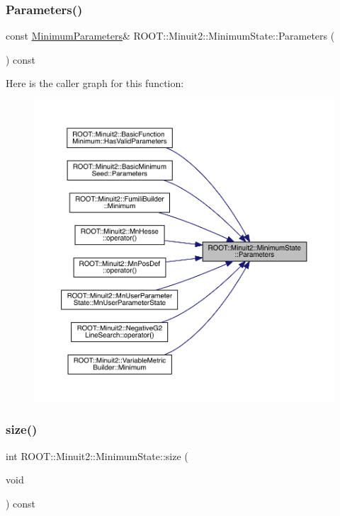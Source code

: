 \subsubsection{\texorpdfstring{Parameters()}{Parameters()}\hspace{0.1cm}{\footnotesize\ttfamily [2/2]}}
{\footnotesize\ttfamily const \mbox{\hyperlink{classROOT_1_1Minuit2_1_1MinimumParameters}{Minimum\+Parameters}}\& R\+O\+O\+T\+::\+Minuit2\+::\+Minimum\+State\+::\+Parameters (\begin{DoxyParamCaption}{ }\end{DoxyParamCaption}) const\hspace{0.3cm}{\ttfamily [inline]}}

Here is the caller graph for this function\+:\nopagebreak
\begin{figure}[H]
\begin{center}
\leavevmode
\includegraphics[width=350pt]{db/dcd/classROOT_1_1Minuit2_1_1MinimumState_aa81bb59c8eb8c262ef2487ca1b025481_icgraph}
\end{center}
\end{figure}
\mbox{\label{classROOT_1_1Minuit2_1_1MinimumState_af680928a4485a4d0db0c81a8283d24bd}} 
\subsubsection{\texorpdfstring{size()}{size()}\hspace{0.1cm}{\footnotesize\ttfamily [1/2]}}
{\footnotesize\ttfamily int R\+O\+O\+T\+::\+Minuit2\+::\+Minimum\+State\+::size (\begin{DoxyParamCaption}\item[{void}]{ }\end{DoxyParamCaption}) const\hspace{0.3cm}{\ttfamily [inline]}}

